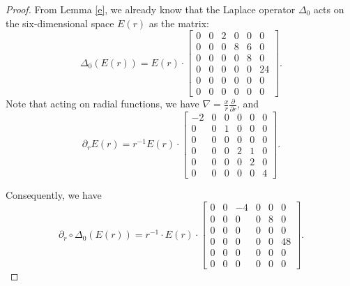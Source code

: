 \documentclass[11pt,letterpaper]{amsart}
\theoremstyle{definition}
\theoremstyle{remark}
\numberwithin{equation}{section}
\begin{document}
\begin{proof}
    From Lemma \ref{e}, we already know that the Laplace operator $\Delta_0$ acts on the six-dimensional space $E(r)$ as the matrix:
\begin{equation}
    \Delta_0(E(r))=E(r)\cdot 
    \begin{bmatrix}
0 & 0 & 2 & 0 & 0& 0\\
0 & 0 & 0 & 8 & 6& 0\\
0 & 0 & 0 & 0 & 8& 0\\
0 & 0 & 0 & 0 & 0& 24\\
0 & 0 & 0 & 0 & 0& 0\\
0 & 0 & 0 & 0 & 0& 0
\end{bmatrix}.
\end{equation}
Note that acting on radial functions, we have $\nabla=\frac{x}{r}\frac{\partial }{\partial r}$, and
\begin{equation*}
        \partial_r E(r)= r^{-1}E(r)\cdot\begin{bmatrix}
-2 & 0 & 0 & 0 & 0& 0\\
0 & 0 & 1 & 0 & 0& 0\\
0 & 0 & 0 & 0 & 0& 0\\
0 & 0 & 0 & 2 & 1& 0\\
0 & 0 & 0 & 0 & 2& 0\\
0 & 0 & 0 & 0 & 0& 4
        \end{bmatrix}.
    \end{equation*}

Consequently, we have
\begin{equation}
    \partial_r \circ \Delta_0(E(r))=r^{-1}\cdot E(r)\cdot 
    \begin{bmatrix}
0 & 0 & -4 & 0 & 0& 0\\
0 & 0 & 0 & 0 & 8& 0\\
0 & 0 & 0 & 0 & 0& 0\\
0 & 0 & 0 & 0 & 0& 48\\
0 & 0 & 0 & 0 & 0& 0\\
0 & 0 & 0 & 0 & 0& 0
\end{bmatrix}.
\end{equation}


\end{proof}
\end{document}
